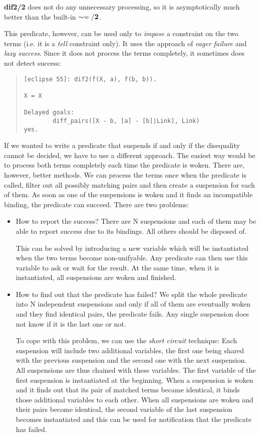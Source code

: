{\bf dif2/2} does not do any unnecessary processing, so it is
asymptotically much better than the built-in ${\bf \sim=/2}$.

This predicate, however, can be used only to {\it impose} a constraint
on the two terms (i.e. it is a {\it tell} constraint only).
It uses the approach of {\it eager failure} and {\it lazy success}.
Since it does not process the terms completely, it sometimes
does not detect success:
\begin{quote}
\begin{verbatim}
[eclipse 55]: dif2(f(X, a), f(b, b)).

X = X

Delayed goals:
        diff_pairs([X - b, [a] - [b]|Link], Link)
yes.
\end{verbatim}
\end{quote}
If we wanted to write a predicate that suspends if and only if
the disequality cannot be decided, we have to use a different
approach.
The easiest way would be to process both terms completely each
time the predicate is woken.
There are, however, better methods.
We can process the terms once when the predicate 
is called, filter out all possibly matching pairs
and then create a suspension for each of them.
As soon as one of the suspensions is woken and it finds
an incompatible binding, the  predicate
can succeed.
There are two problems:
\begin{itemize}
\item How to report the success? There are N suspensions
and each of them may be able to report success due to its bindings.
All others should be disposed of.

This can be solved by introducing a new variable
which will be instantiated when the two terms become
non-unifyable. Any predicate can then use this variable
to ask or wait for the result.
At the same time, when it is instantiated, all
suspensions are woken and finished.

\item How to find out that the predicate has failed?
We split the whole predicate into N independent suspensions
and only if all of them are eventually woken and they find identical
pairs, the predicate fails. Any single suspension does not
know if it is the last one or not.

To cope with this problem, we can use the {\it short
circuit} technique:
Each suspension will include two additional variables, the first
one being shared with the previous suspension and the second
one with the next suspension.
All suspensions are thus chained with these variables.
The first variable of the first suspension is instantiated
at the beginning.
When a suspension is woken and it finds out that its pair
of matched terms became identical, it binds those additional
variables to each other.
When all suspensions are woken and their pairs become
identical, the second variable of the last suspension
becomes instantiated and this can be used
for notification that the predicate has failed.

\end{itemize}

